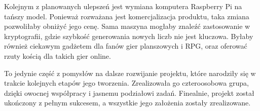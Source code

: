 Kolejnym z planowanych ulepszeń jest wymiana komputera Raspberry Pi na tańszy model. Ponieważ rozważana jest komercjalizacja
produktu, taka zmiana pozwoliłaby obniżyć jego cenę. Sama maszyna mogłaby znaleźć zastosowanie w kryptografii, gdzie 
szybkość generowania nowych liczb nie jest kluczowa. Byłaby również ciekawym gadżetem dla fanów gier planszowych i RPG,
oraz oferować rzuty kością dla takich gier online.

To jedynie część z pomysłów na dalsze rozwijanie projektu, które narodziły się w trakcie kolejnych etapów jego tworzenia.
Zrealizowała go czteroosobowa grupa, dzięki owocnej współpracy i jasnemu podziałowi zadań. 
Finealnie, projekt został ukończony z pełnym sukcesem, a wszystkie jego założenia zostały zrealizowane. 